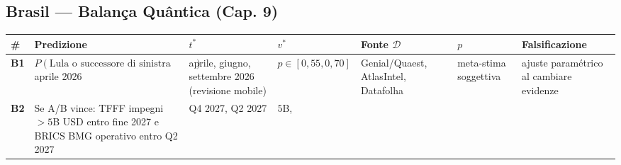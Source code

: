 \subsection{Brasil --- Balança Quântica (Cap.
9)}\label{brasile-bilanciere-quantistico-cap.-9}

{\def\LTcaptype{none} %
{\small\begin{longtable}[]{@{}
  >{\raggedright\arraybackslash}p{}
  >{\raggedright\arraybackslash}p{}
  >{\raggedright\arraybackslash}p{}
  >{\raggedright\arraybackslash}p{}
  >{\raggedright\arraybackslash}p{}
  >{\raggedright\arraybackslash}p{}
  >{\raggedright\arraybackslash}p{}@{}}
\toprule\noalign{}
\begin{minipage}[b]{\linewidth}\raggedright
\#
\end{minipage} & \begin{minipage}[b]{\linewidth}\raggedright
Predizione
\end{minipage} & \begin{minipage}[b]{\linewidth}\raggedright
\(t^*\)
\end{minipage} & \begin{minipage}[b]{\linewidth}\raggedright
\(v^*\)
\end{minipage} & \begin{minipage}[b]{\linewidth}\raggedright
Fonte \(\mathcal{D}\)
\end{minipage} & \begin{minipage}[b]{\linewidth}\raggedright
\(p\)
\end{minipage} & \begin{minipage}[b]{\linewidth}\raggedright
Falsificazione
\end{minipage} \\
\midrule\noalign{}
\endhead
\bottomrule\noalign{}
\endlastfoot
\textbf{B1} & \(P(\text{Lula o successore di sinistra vince elezioni})\)
aprile 2026 & aprile, giugno, settembre 2026 (revisione mobile) &
\(p \in [0{,}55, 0{,}70]\) & Genial/Quaest, AtlasIntel, Datafolha &
meta-stima soggettiva & ajuste paramétrico al cambiare
evidenze \\
\textbf{B2} & Se A/B vince: TFFF impegni \(> 5\)B USD entro fine 2027 e
BRICS BMG operativo entro Q2 2027 & Q4 2027, Q2 2027 & \(5\)B,

\end{longtable}}}
